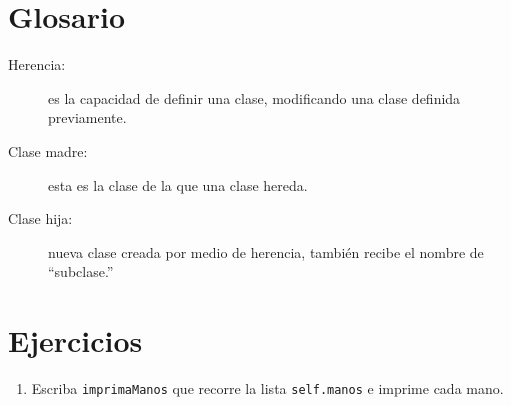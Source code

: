 \section{Glosario}

\begin{description}

\item[Herencia:] es la capacidad de definir una clase, modificando 
una clase definida previamente.

\item[Clase madre:] esta es la clase de la que una clase hereda.

\item[Clase hija:] nueva clase creada por medio de herencia,
también recibe el nombre de ``subclase.''


\end{description}

\section{Ejercicios}
\begin{enumerate}

\item Escriba \texttt{imprimaManos} que recorre
la lista \texttt{self.manos} e imprime cada mano.

\end{enumerate}